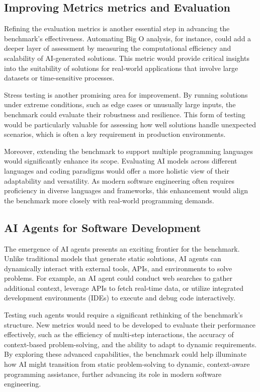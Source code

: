 \subsection{Improving Metrics metrics and Evaluation}

Refining the evaluation metrics is another essential step in advancing the benchmark’s effectiveness. Automating Big O analysis, for instance, could add a deeper layer of assessment by measuring the computational efficiency and scalability of AI-generated solutions. This metric would provide critical insights into the suitability of solutions for real-world applications that involve large datasets or time-sensitive processes.

Stress testing is another promising area for improvement. By running solutions under extreme conditions, such as edge cases or unusually large inputs, the benchmark could evaluate their robustness and resilience. This form of testing would be particularly valuable for assessing how well solutions handle unexpected scenarios, which is often a key requirement in production environments.

Moreover, extending the benchmark to support multiple programming languages would significantly enhance its scope. Evaluating AI models across different languages and coding paradigms would offer a more holistic view of their adaptability and versatility. As modern software engineering often requires proficiency in diverse languages and frameworks, this enhancement would align the benchmark more closely with real-world programming demands.


\subsection{AI Agents for Software Development}


The emergence of AI agents presents an exciting frontier for the benchmark. Unlike traditional models that generate static solutions, AI agents can dynamically interact with external tools, APIs, and environments to solve problems. For example, an AI agent could conduct web searches to gather additional context, leverage APIs to fetch real-time data, or utilize integrated development environments (IDEs) to execute and debug code interactively.

Testing such agents would require a significant rethinking of the benchmark’s structure. New metrics would need to be developed to evaluate their performance effectively, such as the efficiency of multi-step interactions, the accuracy of context-based problem-solving, and the ability to adapt to dynamic requirements. By exploring these advanced capabilities, the benchmark could help illuminate how AI might transition from static problem-solving to dynamic, context-aware programming assistance, further advancing its role in modern software engineering.
















